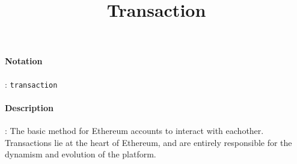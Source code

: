 \documentclass[10pt,a4paper,oneside]{scrartcl}
\author{}
\title{Transaction}
\date{}
\begin{document}
\maketitle
\paragraph{Notation}: \texttt{transaction}
\paragraph{Description}: The basic method for Ethereum accounts to interact with eachother. Transactions lie at the heart of Ethereum, and are entirely responsible for the dynamism and evolution of the platform.
\end{document}
